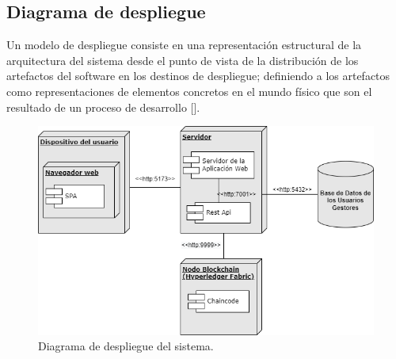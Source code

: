 %

\subsection{Diagrama de despliegue}
Un modelo de despliegue consiste en una representación estructural de la arquitectura del sistema desde el punto de vista de la distribución de los artefactos del software en los destinos de despliegue; definiendo a los artefactos como representaciones de elementos concretos en el mundo físico que son el resultado de un proceso de desarrollo [\cite{91}]. 

\begin{figure}[htbp]
\centering
\includegraphics[width=\textwidth]{Graphics/deploy}
\caption{Diagrama de despliegue del sistema.}
\label{fig:deploy}
\end{figure}


